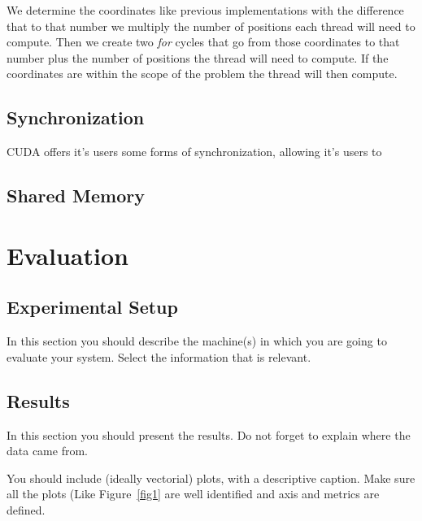 \documentclass[runningheads]{llncs}
\begin{document}
We determine the coordinates like previous implementations with the difference that to that number we multiply the number of positions each thread will need to compute. %
Then we create two \textit{for} cycles that go from those coordinates to that number plus the number of positions the thread will need to compute. If the coordinates are within the scope of the problem the thread will then compute.

\subsection{Synchronization}

CUDA offers it's users some forms of synchronization, allowing it's users to

\subsection{Shared Memory}


\section{Evaluation}

\subsection{Experimental Setup}

In this section you should describe the machine(s) in which you are going to evaluate your system. Select the information that is relevant.


\subsection{Results}

In this section you should present the results. Do not forget to explain where the data came from. 

You should include (ideally vectorial) plots, with a descriptive caption. Make sure all the plots (Like Figure~\ref{fig1} are well identified and axis and metrics are defined.
\end{document}
